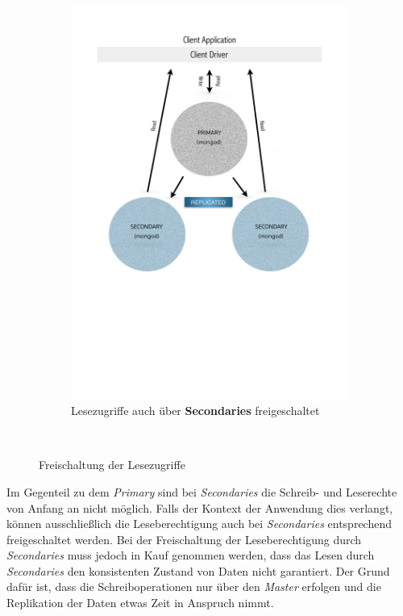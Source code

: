 \begin{figure}[H]
\begin{subfigure}[t]{0.49\textwidth}
	\includegraphics[trim = 0mm 90mm 0mm 20mm, clip, width=1.0\textwidth]{resources/replicaSet/eventualConsistency}
	\caption[Lesezugriffe auch über Secondaries freigeschaltet]{Lesezugriffe auch über \textbf{Secondaries} freigeschaltet}
	\label{img:slaveOk}
   \end{subfigure}\\[5pt]%
   \caption{Freischaltung der Lesezugriffe}
   \label{img:secondariesLowToRead}
\end{figure}
Im Gegenteil zu dem \textit{Primary} sind bei \textit{Secondaries} die Schreib- und Leserechte von Anfang an nicht möglich. Falls der Kontext der Anwendung dies verlangt, können ausschließlich die Leseberechtigung auch bei \textit{Secondaries} entsprechend freigeschaltet werden. Bei der Freischaltung der Leseberechtigung durch \textit{Secondaries} muss jedoch in Kauf genommen werden, dass das Lesen durch \textit{Secondaries} den konsistenten Zustand von Daten nicht garantiert. Der Grund dafür ist, dass die Schreiboperationen nur über den \textit{Master} erfolgen und die Replikation der Daten etwas Zeit in Anspruch nimmt.

